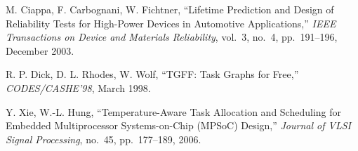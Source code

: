 \begin{thebibliography}{99}
    M. Ciappa, F. Carbognani, W. Fichtner,
    ``Lifetime Prediction and Design of Reliability Tests for High-Power Devices in Automotive Applications,''
    \emph{IEEE Transactions on Device and Materials Reliability},
    vol.~3, no.~4, pp.~191--196, December 2003.

    R. P. Dick, D. L. Rhodes, W. Wolf,
    ``TGFF: Task Graphs for Free,''
    \emph{CODES/CASHE'98},
    March 1998.

    Y. Xie, W.-L. Hung,
    ``Temperature-Aware Task Allocation and Scheduling for Embedded Multiprocessor Systems-on-Chip (MPSoC) Design,''
    \emph{Journal of VLSI Signal Processing},
    no.~45, pp.~177--189, 2006.
\end{thebibliography}

